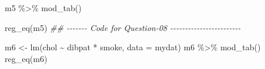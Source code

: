 \documentclass[
  12pt,
  oneside]{article}
\newenvironment{Shaded}{}{}
\newcommand{\AttributeTok}[1]{\textcolor[rgb]{0.49,0.56,0.16}{#1}}
\newcommand{\DocumentationTok}[1]{\textcolor[rgb]{0.73,0.13,0.13}{\textit{#1}}}
\newcommand{\FunctionTok}[1]{\textcolor[rgb]{0.02,0.16,0.49}{#1}}
\newcommand{\NormalTok}[1]{#1}
\newcommand{\OtherTok}[1]{\textcolor[rgb]{0.00,0.44,0.13}{#1}}
\newcommand{\SpecialCharTok}[1]{\textcolor[rgb]{0.25,0.44,0.63}{#1}}
\begin{document}
\begin{Shaded}
\begin{Highlighting}[]
\NormalTok{m5 }\SpecialCharTok{\%\textgreater{}\%} \FunctionTok{mod\_tab}\NormalTok{()}

\FunctionTok{reg\_eq}\NormalTok{(m5)}
\DocumentationTok{\#\# {-}{-}{-}{-}{-}{-}{-} Code for Question{-}08 {-}{-}{-}{-}{-}{-}{-}{-}{-}{-}{-}{-}{-}{-}{-}{-}{-}{-}{-}{-}{-}{-}{-}{-}}

\NormalTok{m6 }\OtherTok{\textless{}{-}} \FunctionTok{lm}\NormalTok{(chol }\SpecialCharTok{\textasciitilde{}}\NormalTok{ dibpat }\SpecialCharTok{*}\NormalTok{ smoke, }\AttributeTok{data =}\NormalTok{ mydat)}
\NormalTok{m6 }\SpecialCharTok{\%\textgreater{}\%} \FunctionTok{mod\_tab}\NormalTok{()}
\FunctionTok{reg\_eq}\NormalTok{(m6)}
\end{Highlighting}
\end{Shaded}
\end{document}
